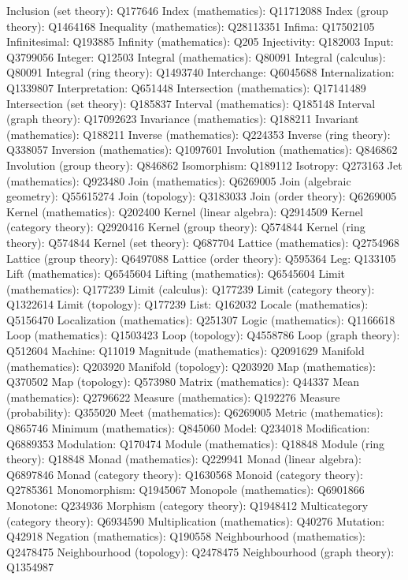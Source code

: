 Inclusion (set theory): Q177646
Index (mathematics): Q11712088
Index (group theory): Q1464168
Inequality (mathematics): Q28113351
Infima: Q17502105
Infinitesimal: Q193885
Infinity (mathematics): Q205
Injectivity: Q182003
Input: Q3799056
Integer: Q12503
Integral (mathematics): Q80091
Integral (calculus): Q80091
Integral (ring theory): Q1493740
Interchange: Q6045688
Internalization: Q1339807
Interpretation: Q651448
Intersection (mathematics): Q17141489
Intersection (set theory): Q185837
Interval (mathematics): Q185148
Interval (graph theory): Q17092623
Invariance (mathematics): Q188211
Invariant (mathematics): Q188211
Inverse (mathematics): Q224353
Inverse (ring theory): Q338057
Inversion (mathematics): Q1097601
Involution (mathematics): Q846862
Involution (group theory): Q846862
Isomorphism: Q189112
Isotropy: Q273163
Jet (mathematics): Q923480
Join (mathematics): Q6269005
Join (algebraic geometry): Q55615274
Join (topology): Q3183033
Join (order theory): Q6269005
Kernel (mathematics): Q202400
Kernel (linear algebra): Q2914509
Kernel (category theory): Q2920416
Kernel (group theory): Q574844
Kernel (ring theory): Q574844
Kernel (set theory): Q687704
Lattice (mathematics): Q2754968
Lattice (group theory): Q6497088
Lattice (order theory): Q595364
Leg: Q133105
Lift (mathematics): Q6545604
Lifting (mathematics): Q6545604
Limit (mathematics): Q177239
Limit (calculus): Q177239
Limit (category theory): Q1322614
Limit (topology): Q177239
List: Q162032
Locale (mathematics): Q5156470
Localization (mathematics): Q251307
Logic (mathematics): Q1166618
Loop (mathematics): Q1503423
Loop (topology): Q4558786
Loop (graph theory): Q512604
Machine: Q11019
Magnitude (mathematics): Q2091629
Manifold (mathematics): Q203920
Manifold (topology): Q203920
Map (mathematics): Q370502
Map (topology): Q573980
Matrix (mathematics): Q44337
Mean (mathematics): Q2796622
Measure (mathematics): Q192276
Measure (probability): Q355020
Meet (mathematics): Q6269005
Metric (mathematics): Q865746
Minimum (mathematics): Q845060
Model: Q234018
Modification: Q6889353
Modulation: Q170474
Module (mathematics): Q18848
Module (ring theory): Q18848
Monad (mathematics): Q229941
Monad (linear algebra): Q6897846
Monad (category theory): Q1630568
Monoid (category theory): Q2785361
Monomorphism: Q1945067
Monopole (mathematics): Q6901866
Monotone: Q234936
Morphism (category theory): Q1948412
Multicategory (category theory): Q6934590
Multiplication (mathematics): Q40276
Mutation: Q42918
Negation (mathematics): Q190558
Neighbourhood (mathematics): Q2478475
Neighbourhood (topology): Q2478475
Neighbourhood (graph theory): Q1354987
